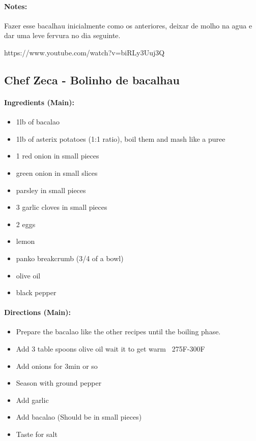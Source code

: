 \documentclass{article}
\begin{document}
\paragraph{Notes:}

Fazer esse bacalhau inicialmente como os anteriores, deixar de molho na agua e dar uma leve fervura no dia seguinte.

https://www.youtube.com/watch?v=biRLy3Uuj3Q

\subsection{Chef Zeca - Bolinho de bacalhau}

\paragraph{Ingredients (Main):}
\begin{itemize}
	\item 1lb of bacalao
	\item 1lb of asterix potatoes (1:1 ratio), boil them and mash like a puree
	\item 1 red onion in small pieces
	\item green onion in small slices
	\item parsley in small pieces
	\item 3 garlic cloves in small pieces
	\item 2 eggs
	\item lemon
	\item panko breakcrumb (3/4 of a bowl)
	\item olive oil
	\item black pepper
\end{itemize}

\paragraph{Directions (Main):}
\begin{itemize}
	\item Prepare the bacalao like the other recipes until the boiling phase.
	\item Add 3 table spoons olive oil wait it to get warm ~275F-300F
	\item Add onions for 3min or so
	\item Season with ground pepper
	\item Add garlic
	\item Add bacalao (Should be in small pieces)
	\item Taste for salt
\end{itemize}
\end{document}
